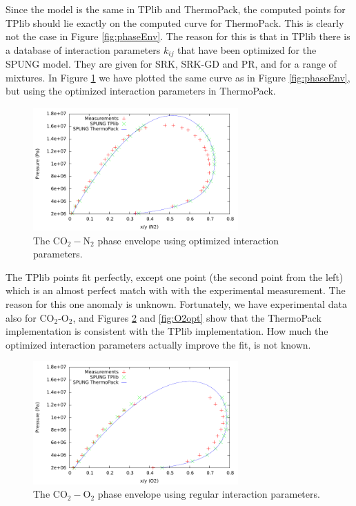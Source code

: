 \documentclass[english]{../thermomemo/thermomemo}
\numberwithin{equation}{section}
\begin{document}
Since the model is the same in TPlib and ThermoPack, the computed
points for TPlib should lie exactly on the computed curve for
ThermoPack. This is clearly not the case in Figure
\ref{fig:phaseEnv}. The reason for this is that in TPlib there is a database of interaction
parameters $k_{ij}$ that have been optimized for the SPUNG model. They
are given for SRK, SRK-GD and PR, and for a range of mixtures. In
Figure \ref{fig:phaseEnv_opt} we have plotted the same curve as in
Figure \ref{fig:phaseEnv}, but using the optimized interaction
parameters in ThermoPack.
\begin{figure}[h]
  \centering
  \includegraphics[width=0.7\textwidth]{figures/phaseEnvelope_optimized.pdf}
  \caption{The $\mathrm{CO}_2-\mathrm N_2$ phase envelope using
    optimized interaction parameters.}
  \label{fig:phaseEnv_opt}
\end{figure}
The TPlib points fit perfectly, except one point (the second point
from the left) which is an almost perfect match with with the
experimental measurement. The reason for this one anomaly is
unknown. Fortunately, we have experimental data also for CO$_2$-O$_2$,
and Figures \ref{fig:O2reg} and \ref{fig:O2opt} show that the
ThermoPack implementation is consistent with the TPlib
implementation. How much the optimized interaction parameters actually
improve the fit, is not known.

\begin{figure}[h]
  \centering
  \includegraphics[width=0.7\textwidth]{figures/phaseEnvelope_O2_regular.pdf}
  \caption{The $\mathrm{CO}_2-\mathrm O_2$ phase envelope using
    regular interaction parameters.}
  \label{fig:O2reg}
\end{figure}
\end{document}
